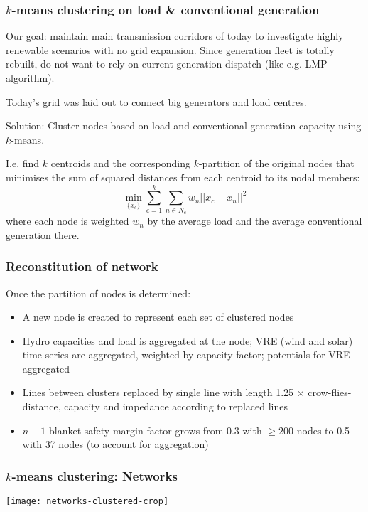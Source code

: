 \documentclass[10pt,aspectratio=169,dvipsnames]{beamer}
\let\olditem\item
\renewcommand{\item}{%
\olditem\vspace{5pt}}
\begin{document}
\begin{frame}
  \frametitle{$k$-means clustering on load \& conventional generation}

  Our \alert{goal}: maintain main transmission corridors of today to
  investigate highly renewable scenarios with no grid expansion. Since generation fleet is totally rebuilt, do not want to rely on current generation dispatch (like e.g. LMP algorithm).

  Today's grid was laid out to connect big generators and load centres.

  \alert{Solution}:
  Cluster nodes based on load and conventional generation capacity using
  $k$-means.

  I.e. find $k$ centroids and the corresponding $k$-partition of the
  original nodes that minimises the sum of squared distances from each
  centroid to its nodal members:
  \begin{equation}
    \min_{\{x_c\}} \sum_{c=1}^k \sum_{n \in N_c} w_n || x_c - x_n ||^2
  \end{equation}
  where each node is weighted $w_n$ by the average load and the
  average conventional generation there.


\end{frame}



\begin{frame}
  \frametitle{Reconstitution of network}

  Once the partition of nodes is determined:
  \begin{itemize}
  \item A new node is created to represent each set of clustered nodes
  \item Hydro capacities and load is aggregated at the node; VRE (wind and solar) time series are aggregated, weighted by capacity factor; potentials for VRE aggregated
  \item Lines between clusters replaced by single line with length 1.25 $\times$ crow-flies-distance, capacity and impedance according to replaced lines
    \item $n-1$ blanket safety margin factor grows from 0.3 with $\geq 200$ nodes to 0.5 with 37 nodes (to account for aggregation)
  \end{itemize}

\end{frame}

\begin{frame}
  \frametitle{$k$-means clustering: Networks}

\centering
 \texttt{[image: networks-clustered-crop]}



\end{frame}
\end{document}
